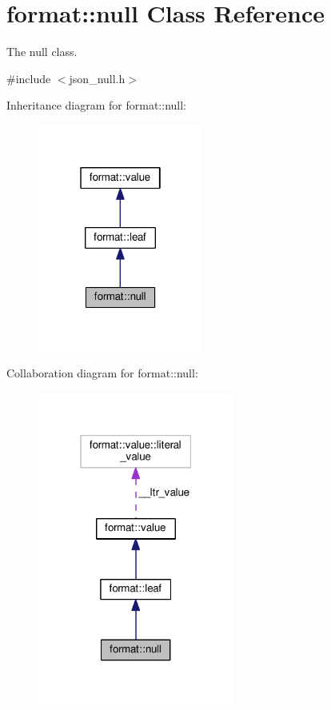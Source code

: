\hypertarget{classformat_1_1null}{}\section{format\+:\+:null Class Reference}
\label{classformat_1_1null}


The null class.  




{\ttfamily \#include $<$json\+\_\+null.\+h$>$}



Inheritance diagram for format\+:\+:null\+:
\nopagebreak
\begin{figure}[H]
\begin{center}
\leavevmode
\includegraphics[width=154pt]{classformat_1_1null__inherit__graph}
\end{center}
\end{figure}


Collaboration diagram for format\+:\+:null\+:
\nopagebreak
\begin{figure}[H]
\begin{center}
\leavevmode
\includegraphics[width=183pt]{classformat_1_1null__coll__graph}
\end{center}
\end{figure}
